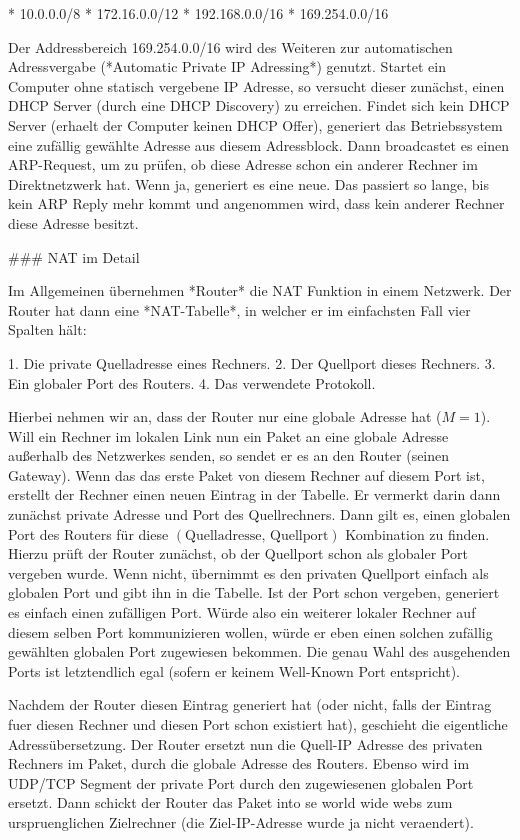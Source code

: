 * 10.0.0.0/8
* 172.16.0.0/12
* 192.168.0.0/16
* 169.254.0.0/16

Der Addressbereich 169.254.0.0/16 wird des Weiteren zur automatischen
Adressvergabe (*Automatic Private IP Adressing*) genutzt. Startet ein Computer
ohne statisch vergebene IP Adresse, so versucht dieser zunächst, einen DHCP
Server (durch eine DHCP Discovery) zu erreichen. Findet sich kein DHCP Server
(erhaelt der Computer keinen DHCP Offer), generiert das Betriebssystem eine
zufällig gewählte Adresse aus diesem Adressblock. Dann broadcastet es einen
ARP-Request, um zu prüfen, ob diese Adresse schon ein anderer Rechner im
Direktnetzwerk hat. Wenn ja, generiert es eine neue. Das passiert so lange, bis
kein ARP Reply mehr kommt und angenommen wird, dass kein anderer Rechner diese
Adresse besitzt.

### NAT im Detail

Im Allgemeinen übernehmen *Router* die NAT Funktion in einem Netzwerk. Der
Router hat dann eine *NAT-Tabelle*, in welcher er im einfachsten Fall vier
Spalten hält:

1. Die private Quelladresse eines Rechners.
2. Der Quellport dieses Rechners.
3. Ein globaler Port des Routers.
4. Das verwendete Protokoll.

Hierbei nehmen wir an, dass der Router nur eine globale Adresse hat ($M =
1$). Will ein Rechner im lokalen Link nun ein Paket an eine globale Adresse
außerhalb des Netzwerkes senden, so sendet er es an den Router (seinen
Gateway). Wenn das das erste Paket von diesem Rechner auf diesem Port ist,
erstellt der Rechner einen neuen Eintrag in der Tabelle. Er vermerkt darin dann
zunächst private Adresse und Port des Quellrechners. Dann gilt es, einen
globalen Port des Routers für diese $(\text{Quelladresse, Quellport})$
Kombination zu finden. Hierzu prüft der Router zunächst, ob der Quellport schon
als globaler Port vergeben wurde. Wenn nicht, übernimmt es den privaten Quellport
einfach als globalen Port und gibt ihn in die Tabelle. Ist der Port schon
vergeben, generiert es einfach einen zufälligen Port. Würde also ein weiterer
lokaler Rechner auf diesem selben Port kommunizieren wollen, würde er eben einen
solchen zufällig gewählten globalen Port zugewiesen bekommen. Die genau Wahl des
ausgehenden Ports ist letztendlich egal (sofern er keinem Well-Known Port
entspricht).

Nachdem der Router diesen Eintrag generiert hat (oder nicht, falls der Eintrag
fuer diesen Rechner und diesen Port schon existiert hat), geschieht die
eigentliche Adressübersetzung. Der Router ersetzt nun die Quell-IP Adresse des
privaten Rechners im Paket, durch die globale Adresse des Routers. Ebenso wird
im UDP/TCP Segment der private Port durch den zugewiesenen globalen Port
ersetzt. Dann schickt der Router das Paket into se world wide webs zum
urspruenglichen Zielrechner (die Ziel-IP-Adresse wurde ja nicht veraendert).

